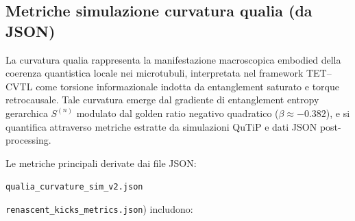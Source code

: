 \documentclass[11pt,a4paper]{article}
\theoremstyle{plain}
\theoremstyle{definition}
\begin{document}
\vspace{0.2cm}

\subsection{Metriche simulazione curvatura qualia (da JSON)}
\label{subsec:qualia-curvature-metrics}

La curvatura qualia rappresenta la manifestazione macroscopica embodied della coerenza quantistica locale nei microtubuli, interpretata nel framework TET–CVTL come torsione informazionale indotta da entanglement saturato e torque retrocausale. Tale curvatura emerge dal gradiente di entanglement entropy gerarchica $S^{(n)}$ modulato dal golden ratio negativo quadratico ($\beta \approx -0.382$), e si quantifica attraverso metriche estratte da simulazioni QuTiP e dati JSON post-processing.


\vspace{0.2cm}

Le metriche principali derivate dai file JSON:

\vspace{0.1cm}

\texttt{qualia\_curvature\_sim\_v2.json}

\vspace{0.1cm}

\texttt{renascent\_kicks\_metrics.json}) includono:
\end{document}
